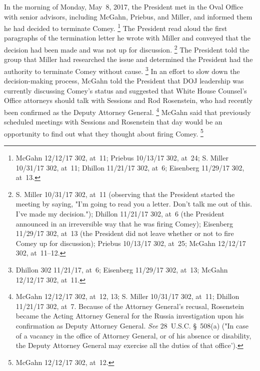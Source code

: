 In the morning of Monday, May~8, 2017, the President met in the Oval Office with senior advisors, including McGahn, Priebus, and Miller, and informed them he had decided to terminate Comey.%
\footnote{McGahn 12/12/17 302, at~11;
Priebus 10/13/17 302, at~24;
S. Miller 10/31/17 302, at~11;
Dhillon 11/21/17 302, at~6;
Eisenberg 11/29/17 302, at~13.}
The President read aloud the first paragraphs of the termination letter he wrote with Miller and conveyed that the decision had been made and was not up for discussion.%
\footnote{S. Miller 10/31/17 302, at~11 (observing that the President started the meeting by saying, "I'm going to read you a letter.
Don't talk me out of this.
I've made my decision.");
Dhillon 11/21/17 302, at~6 (the President announced in an irreversible way that he was firing Comey);
Eisenberg 11/29/17 302, at~13 (the President did not leave whether or not to fire Comey up for discussion);
Priebus 10/13/17 302, at~25;
McGahn 12/12/17 302, at~11--12.}
The President told the group that Miller had researched the issue and determined the President had the authority to terminate Comey without cause.%
\footnote{Dhillon 302 11/21/17, at~6;
Eisenberg 11/29/17 302, at~13;
McGahn 12/12/17 302, at~11.}
In an effort to slow down the decision-making process, McGahn told the President that DOJ leadership was currently discussing Comey's status and suggested that White House Counsel's Office attorneys should talk with Sessions and Rod Rosenstein, who had recently been confirmed as the Deputy Attorney General.%
\footnote{McGahn 12/12/17 302, at~12, 13;
S. Miller 10/31/17 302, at~11;
Dhillon 11/21/17 302, at~7.
Because of the Attorney General's recusal, Rosenstein became the Acting Attorney General for the Russia investigation upon his confirmation as Deputy Attorney General.
\textit{See} 28~U.S.C. \S~508(a) ("In case of a vacancy in the office of Attorney General, or of his absence or disability, the Deputy Attorney General may exercise all the duties of that office').}
McGahn said that previously scheduled meetings with Sessions and Rosenstein that day would be an opportunity to find out what they thought about firing Comey.%
\footnote{McGahn 12/12/17 302, at~12.}

